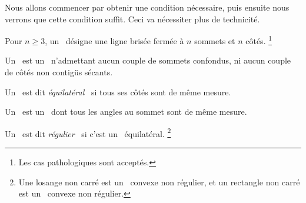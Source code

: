 Nous allons commencer par obtenir une condition nécessaire, puis ensuite nous verrons que cette condition suffit.
Ceci va nécessiter plus de technicité.




\begin{defi}
	Pour $n \geq 3$, un \og \emph{\ncycle} \fg\ désigne une ligne brisée fermée à $n$ sommets et $n$ côtés.%
	\footnote{
		Les cas pathologiques sont acceptés.
	}
\end{defi}


\begin{defi}
	Un \og \emph{\ngone} \fg\ est un \ncycle\ n'admettant aucun couple de sommets confondus, ni aucun couple de côtés non contigüs sécants.
\end{defi}


\begin{defi}
	Un \ngone\ est dit \og \emph{équilatéral} \fg\ si tous ses côtés sont de même mesure.
\end{defi}


\begin{defi}
	Un \og \emph{\niso} \fg\ est un \ngone\ dont tous les angles au sommet sont de même mesure.
\end{defi}


\begin{defi}
	Un \ngone\ est dit \og \emph{régulier} \fg\ si c'est un \niso\ équilatéral.%
	\footnote{
		Une losange non carré est un \nequi\ convexe non régulier, et un rectangle non carré est un \niso\ convexe non régulier.
	}
\end{defi}
